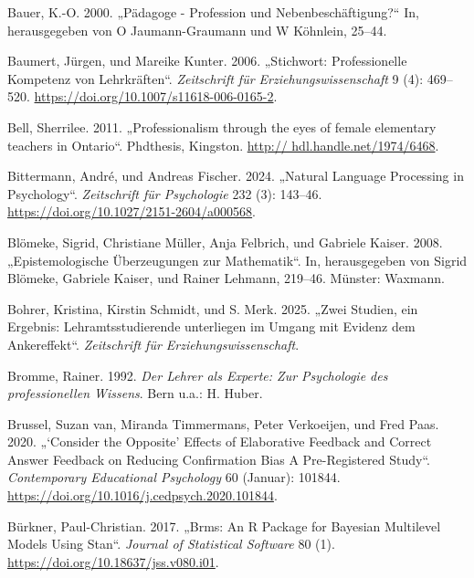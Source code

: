 \documentclass[
  letterpaper,
  DIV=11]{scrartcl}
\newlength{\cslhangindent}
\newenvironment{CSLReferences}[2] %
 {\begin{list}{}{%
  \setlength{\itemindent}{0pt}
  \setlength{\leftmargin}{0pt}
  \setlength{\parsep}{0pt}
  \ifodd #1
   \setlength{\leftmargin}{\cslhangindent}
   \setlength{\itemindent}{-1\cslhangindent}
  \fi
  \setlength{\itemsep}{#2\baselineskip}}}
 {\end{list}}
\begin{document}
\label{refs}
\begin{CSLReferences}{1}{0}
Bauer, K.-O. 2000. {„Pädagoge - Profession und Nebenbeschäftigung?``}
In, herausgegeben von O Jaumann-Graumann und W Köhnlein, 25--44.

Baumert, Jürgen, und Mareike Kunter. 2006. {„Stichwort: Professionelle
Kompetenz von Lehrkräften``}. \emph{Zeitschrift für
Erziehungswissenschaft} 9 (4): 469--520.
\url{https://doi.org/10.1007/s11618-006-0165-2}.

Bell, Sherrilee. 2011. {„Professionalism through the eyes of female
elementary teachers in Ontario``}. Phdthesis, Kingston.
\href{http://\%20hdl.handle.net/1974/6468}{http://
hdl.handle.net/1974/6468}.

Bittermann, André, und Andreas Fischer. 2024. {„Natural Language
Processing in Psychology``}. \emph{Zeitschrift für Psychologie} 232 (3):
143--46. \url{https://doi.org/10.1027/2151-2604/a000568}.

Blömeke, Sigrid, Christiane Müller, Anja Felbrich, und Gabriele Kaiser.
2008. {„Epistemologische Überzeugungen zur Mathematik``}. In,
herausgegeben von Sigrid Blömeke, Gabriele Kaiser, und Rainer Lehmann,
219--46. Münster: Waxmann.

Bohrer, Kristina, Kirstin Schmidt, und S. Merk. 2025. {„{Zwei Studien,
ein Ergebnis: Lehramtsstudierende unterliegen im Umgang mit Evidenz dem
Ankereffekt}``}. \emph{Zeitschrift für Erziehungswissenschaft}.

Bromme, Rainer. 1992. \emph{Der Lehrer als Experte: Zur Psychologie des
professionellen Wissens}. Bern u.a.: H. Huber.

Brussel, Suzan van, Miranda Timmermans, Peter Verkoeijen, und Fred Paas.
2020. {„{`}Consider the Opposite{'} {\textendash} Effects of Elaborative
Feedback and Correct Answer Feedback on Reducing Confirmation Bias
{\textendash} A Pre-Registered Study``}. \emph{Contemporary Educational
Psychology} 60 (Januar): 101844.
\url{https://doi.org/10.1016/j.cedpsych.2020.101844}.

Bürkner, Paul-Christian. 2017. {„Brms: An R Package for Bayesian
Multilevel Models Using Stan``}. \emph{Journal of Statistical Software}
80 (1). \url{https://doi.org/10.18637/jss.v080.i01}.


\end{CSLReferences}
\end{document}
